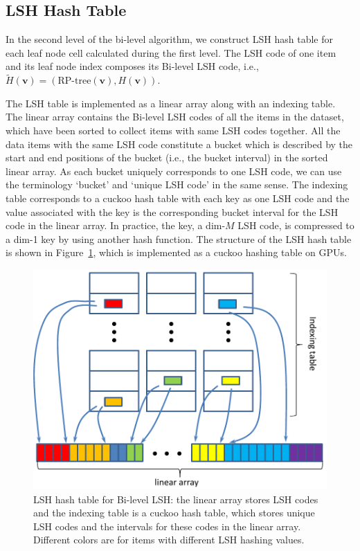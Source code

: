 \subsection{LSH Hash Table}
In the second level of the bi-level algorithm, we construct LSH hash table for each leaf node cell calculated during the first level.
The LSH code of one item and its leaf node index composes its Bi-level LSH code, i.e., $\tilde{H}(\mathbf v) = (\text{RP-tree}(\mathbf v), H(\mathbf v))$.

The LSH table is implemented as a linear array along with an indexing table. The linear array contains the Bi-level LSH codes of all the items in the dataset, which have been sorted to collect items with same LSH codes together. All the data items with the same LSH code constitute a bucket which is described by the start and end positions of the bucket (i.e., the bucket interval) in the sorted linear array. As each bucket uniquely corresponds to one LSH code, we can use the terminology `bucket' and `unique LSH code' in the same sense. The indexing table corresponds to a cuckoo hash table with each key as one LSH code and the value associated with the key is the corresponding bucket interval for the LSH code in the linear array. In practice, the key, a dim-$M$ LSH code, is compressed to a dim-1 key by using another hash function. The structure of the LSH hash table is shown in Figure~\ref{fig:6:hashtable}, which is implemented as a cuckoo hashing table on GPUs.

\begin{figure}[htb]
  \centering
  \includegraphics[width=0.8\linewidth]{figs/6/hashtable.pdf}
  \caption[LSH hash table for Bi-level LSH]{\label{fig:6:hashtable} LSH hash table for Bi-level LSH: the linear array stores LSH codes and the indexing table is a cuckoo hash table, which stores unique LSH codes and the intervals for these codes in the linear array. Different colors are for items with different LSH hashing values.}
\end{figure}

